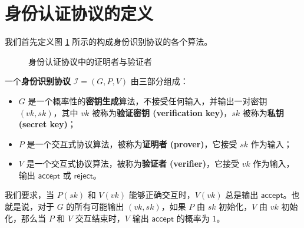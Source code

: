\section{身份认证协议的定义}


我们首先定义图 \ref{fig:18—1} 所示的构成身份识别协议的各个算法。

\begin{figure}
    \centering
    
    \caption{身份认证协议中的证明者与验证者}
    \label{fig:18—1}
\end{figure}

\begin{definition}
一个\textbf{身份识别协议} $\mathcal{I}=(G,P,V)$ 由三部分组成：
\begin{itemize}
    \item $G$ 是一个概率性的\textbf{密钥生成}算法，不接受任何输入，并输出一对密钥 $(vk,sk)$，其中 $vk$ 被称为\textbf{验证密钥 (verification key)}，$sk$ 被称为\textbf{私钥 (secret key)}；
    \item $P$ 是一个交互式协议算法，被称为\textbf{证明者 (prover)}，它接受 $sk$ 作为输入；
    \item $V$ 是一个交互式协议算法，被称为\textbf{验证者 (verifier)}，它接受 $vk$ 作为输入，输出 $\mathsf{accept}$ 或 $\mathsf{reject}$。
\end{itemize}
我们要求，当 $P(sk)$ 和 $V(vk)$ 能够正确交互时，$V(vk)$ 总是输出 $\mathsf{accept}$。也就是说，对于 $G$ 的所有可能输出 $(vk,sk)$，如果 $P$ 由 $sk$ 初始化，$V$ 由 $vk$ 初始化，那么当 $P$ 和 $V$ 交互结束时，$V$ 输出 $\mathsf{accept}$ 的概率为 $1$。

\end{definition}